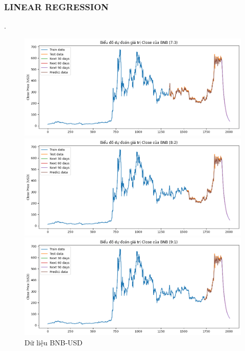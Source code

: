 \documentclass[conference]{IEEEtran}
\begin{document}
\subsubsection{LINEAR REGRESSION}.
    \begin{figure}[H]
			\centering
			\begin{minipage}{0.15\textwidth}
				\centering
				\includegraphics[width=1\textwidth]{Figure/LN_BNB_73.png}
			\end{minipage}
			\hfill
			\begin{minipage}{0.15\textwidth}
				\centering
				\includegraphics[width=1\textwidth]{Figure/LN_BNB_82.png}
			\end{minipage}
			\hfill
			\begin{minipage}{0.15\textwidth}
				\centering
			\includegraphics[width=1\textwidth]{Figure/LN_BNB_91.png}
			\end{minipage}
			\caption{Dữ liệu BNB-USD}
			\label{fig:1}
		\end{figure}
\end{document}
